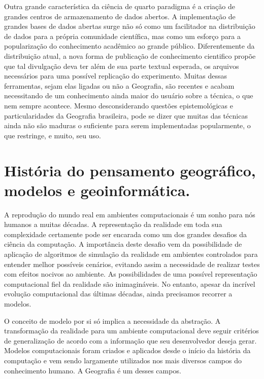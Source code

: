 Outra grande característica da ciência de quarto paradigma é a criação de grandes centros de armazenamento de dados abertos. A implementação de grandes bases de dados abertas surge não só como um facilitador na distribuição de dados para a própria comunidade científica, mas como um esforço para a popularização do conhecimento acadêmico ao grande público. Diferentemente da distribuição atual, a nova forma de publicação de conhecimento cientifico propõe que tal divulgação deva ter além de sua parte textual esperada, os arquivos necessários para uma possível replicação do experimento. Muitas dessas ferramentas, sejam elas ligadas ou não a Geografia, são recentes e acabam necessitando de um conhecimento ainda maior do usuário sobre a técnica, o que nem sempre acontece. Mesmo desconsiderando questões epistemológicas e particularidades da Geografia brasileira, pode se dizer que muitas das técnicas ainda não são maduras o suficiente para serem implementadas popularmente, o que restringe, e muito, seu uso.

\chapter{História do pensamento geográfico, modelos e geoinformática.}
A reprodução do mundo real em ambientes computacionais é um sonho para nós humanos a muitas décadas. A representação da realidade em toda sua complexidade certamente pode ser encarada como um dos grandes desafios da ciência da computação. A importância deste desafio vem da possibilidade de aplicação de algoritmos de simulação da realidade em ambientes controlados para entender melhor possíveis cenários, evitando assim a necessidade de realizar testes com efeitos nocivos ao ambiente. As possibilidades de uma possível representação computacional fiel da realidade são inimagináveis. No entanto, apesar da incrível evolução computacional das últimas décadas, ainda precisamos recorrer a modelos.

O conceito de modelo por si só implica a necessidade da abstração. A transformação da realidade para um ambiente computacional deve seguir critérios de generalização de acordo com a informação que seu desenvolvedor deseja gerar. Modelos computacionais foram criados e aplicados desde o início da história da computação e vem sendo largamente utilizados nos mais diversos campos do conhecimento humano. A Geografia é um desses campos. 

